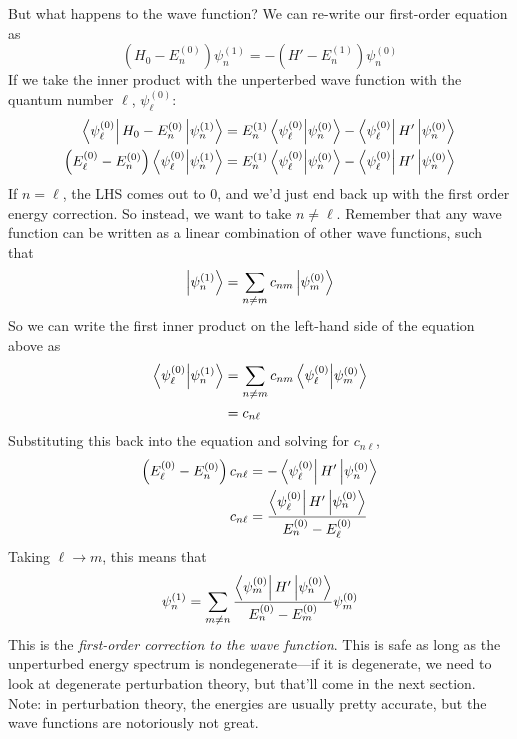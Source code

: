 \documentclass[a4paper]{article}
\begin{document}
But what happens to the wave function? We can re-write our first-order equation
as
\[ \left(H_0-E_n^{(0)}\right)\psi_n^{(1)} =
	-\left(H'-E_n^{(1)}\right)\psi_n^{(0)} \]
If we take the inner product with the unperterbed wave function with
the quantum number $\ell$, $\psi^{(0)}_\ell$:
\begin{align*}
	\left\langle \psi_\ell^{(0)} \right\rvert H_0-E_n^{(0)}\left\lvert \psi_n^{(1)}\right\rangle &=
		E_n^{(1)}\left\langle \psi_\ell^{(0)}\middle\vert \psi_n^{(0)} \right\rangle -
		\left\langle \psi_\ell^{(0)} \right\rvert H'\left\lvert \psi_n^{(0)}\right\rangle\\
	\left(E_\ell^{(0)}-E_n^{(0)}\right)
	\left\langle \psi_\ell^{(0)}\middle\vert \psi_n^{(1)} \right\rangle &=
		E_n^{(1)}\left\langle \psi_\ell^{(0)}\middle\vert \psi_n^{(0)} \right\rangle -
		\left\langle \psi_\ell^{(0)} \right\rvert H'\left\lvert \psi_n^{(0)}\right\rangle\\
\end{align*}
If $n=\ell$, the LHS comes out to 0, and we'd just end back up with the first
order energy correction. So instead, we want to take $n\neq\ell$. Remember that
any wave function can be written as a linear combination of other wave
functions, such that
\[ \left\lvert \psi_n^{(1)}\right\rangle = \sum_{n\neq m} c_{nm}\left\lvert \psi_m^{(0)}\right\rangle \]
So we can write the first inner product on the left-hand side of the equation
above as
\begin{align*}
	\left\langle \psi_\ell^{(0)}\middle\vert \psi_n^{(1)} \right\rangle &=
		\sum_{n\neq m} c_{nm}\left\langle \psi_\ell^{(0)}\middle\vert \psi_m^{(0)} \right\rangle\\
		&= c_{n\ell}
\end{align*}
Substituting this back into the equation and solving for $c_{n\ell}$,
\begin{align*}
	\left(E_\ell^{(0)}-E_n^{(0)}\right)c_{n\ell} &=
	-\left\langle \psi_\ell^{(0)} \right\rvert H'\left\lvert \psi_n^{(0)}\right\rangle\\
	c_{n\ell} &= \frac{\left\langle \psi_\ell^{(0)} \right\rvert H'\left\lvert \psi_n^{(0)}\right\rangle}
		{E_n^{(0)}-E_\ell^{(0)}}
\end{align*}
Taking $\ell\to m$, this means that
\[
	\psi_n^{(1)} = \sum_{m\neq n}
		\frac{\left\langle \psi_m^{(0)} \right\rvert H'\left\lvert \psi_n^{(0)}\right\rangle}
		{E_n^{(0)}-E_m^{(0)}}\psi_m^{(0)}
\]
This is the \emph{first-order correction to the wave function}. This is safe
as long as the unperturbed energy spectrum is nondegenerate---if it is
degenerate, we need to look at degenerate perturbation theory, but that'll
come in the next section. Note: in perturbation theory, the energies are
usually pretty accurate, but the wave functions are notoriously not great.
\end{document}
